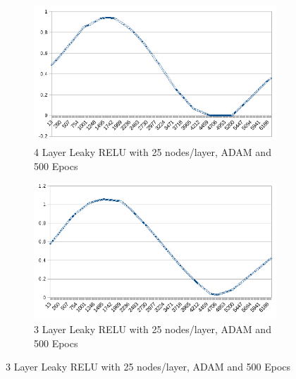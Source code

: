 \documentclass[12pt]{article}
\begin{document}
\begin{figure}
\begin{subfigure}{.5\textwidth}
\end{subfigure}
\begin{subfigure}{.5\textwidth}
  \centering
  \includegraphics[width=.8\linewidth]{./images/sineApproximation/Adam25Node4LayerLeakyRELU300Batch500Iter.png}
  \caption{4 Layer Leaky RELU with 25 nodes/layer, ADAM and 500 Epocs}
\end{subfigure}
\begin{subfigure}{.5\textwidth}
  \centering
  \includegraphics[width=.8\linewidth]{./images/sineApproximation/Adam25Node3LayerLeakyRELU300Batch500Iter.png}
  \caption{3 Layer Leaky RELU with 25 nodes/layer, ADAM and 500 Epocs}
\end{subfigure}


\end{figure}
\end{document}

